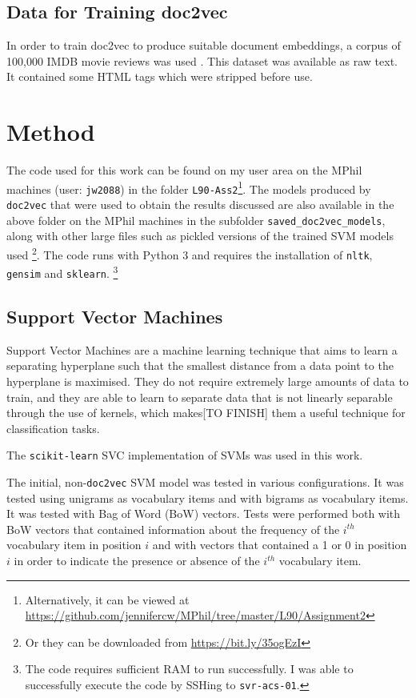 \documentclass[twocolumn]{article}
\begin{document}
\subsection{Data for Training doc2vec}

In order to train doc2vec to produce suitable document embeddings, a corpus of 100,000 IMDB movie reviews was used \cite{bigimdb}. This dataset was available as raw text. It contained some HTML tags which were stripped before use.

\section{Method}

The code used for this work can be found on my user area on the MPhil machines (user: \texttt{jw2088}) in the folder \texttt{L90-Ass2}\footnote{Alternatively, it can be viewed at \url{https://github.com/jennifercw/MPhil/tree/master/L90/Assignment2}}. The models produced by \texttt{doc2vec} that were used to obtain the results discussed are also available in the above folder on the MPhil machines in the subfolder \texttt{saved\_doc2vec\_models}, along with other large files such as pickled versions of the trained SVM models used \footnote{Or they can be downloaded from \url{https://bit.ly/35ogEzI}}. The code runs with Python 3 and requires the installation of \texttt{nltk}, \texttt{gensim} and \texttt{sklearn}. \footnote{The code requires sufficient RAM to run successfully. I was able to successfully execute the code by SSHing to \texttt{svr-acs-01}.} 

\subsection{Support Vector Machines}

Support Vector Machines are a machine learning technique that aims to learn a separating hyperplane such that the smallest distance from a data point to the hyperplane is maximised. They do not require extremely large amounts of data to train, and they are able to learn to separate data that is not linearly separable through the use of kernels, which makes[TO FINISH]
 them a useful technique for classification tasks.

The \texttt{scikit-learn}\cite{scikit-learn} SVC implementation of SVMs was used in this work.

The initial, non-\texttt{doc2vec} SVM model was tested in various configurations. It was tested using unigrams as vocabulary items and with bigrams as vocabulary items. It was tested with Bag of Word (BoW) vectors. Tests were performed both with BoW vectors that contained information about the frequency of the $i^{th}$ vocabulary item in position $i$ and with vectors that contained a 1 or 0 in position $i$ in order to indicate the presence or absence of the $i^{th}$ vocabulary item. 
\end{document}
